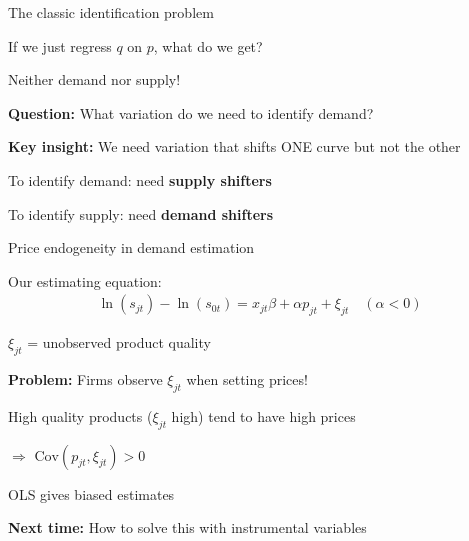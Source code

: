 \documentclass[notes,11pt, aspectratio=169]{beamer}
\newenvironment{wideitemize}{\itemize\addtolength{\itemsep}{10pt}}{\enditemize}
\begin{document}
\begin{frame}{The classic identification problem}
	\begin{wideitemize}
		\item If we just regress $q$ on $p$, what do we get?
		\item Neither demand nor supply!
		\item \textbf{Question:} What variation do we need to identify demand? \pause
		\item \textbf{Key insight:} We need variation that shifts ONE curve but not the other
		\begin{wideitemize}
			\vspace{5pt}
			\item To identify demand: need \textbf{supply shifters}
			\item To identify supply: need \textbf{demand shifters}
		\end{wideitemize}
	\end{wideitemize}
\end{frame}

\begin{frame}{Price endogeneity in demand estimation}
	\begin{wideitemize}
		\item Our estimating equation:
		\begin{align*}
			\ln(s_{jt}) - \ln(s_{0t}) = x_{jt} \beta + \alpha p_{jt} + \xi_{jt} \quad (\alpha < 0)
		\end{align*}
		\item $\xi_{jt}$ = unobserved product quality
		\item \textbf{Problem:} Firms observe $\xi_{jt}$ when setting prices!
		\item High quality products ($\xi_{jt}$ high) tend to have high prices
		\item $\Rightarrow$ $\text{Cov}(p_{jt}, \xi_{jt}) > 0$
		\item OLS gives biased estimates
		\item \textbf{Next time:} How to solve this with instrumental variables
	\end{wideitemize}
\end{frame}

\end{document}
